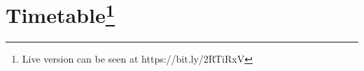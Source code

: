 \documentclass[a4paper,12pt]{article}
\begin{document}
\section*{Timetable\footnote{Live version can be seen at https://bit.ly/2RTiRxV}}

\begin{figure}[ht]
  \centering
\end{figure}

\pagebreak

\end{document}
